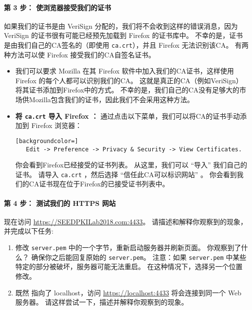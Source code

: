 \paragraph{第 3 步： 使浏览器接受我们的证书}
如果我们的证书是由 VeriSign 分配的，我们将不会收到这样的错误消息，因为 VeriSign 的证书很有可能已经预先加载到 Firefox 的证书库中。
不幸的是，\pkiserver 证书是由我们自己的CA签名的（即使用 {\tt ca.crt}），并且 Firefox 无法识别该CA。
有两种方法可以使 Firefox 接受我们的CA自签名证书。

\begin{itemize}

\item 我们可以要求 Mozilla 在其 Firefox 软件中加入我们的CA证书，这样使用 Firefox 的每个人都可以识别我们的CA。
这就是真正的CA（例如VeriSign）将其证书添加到Firefox中的方式。
不幸的是，我们自己的CA没有足够大的市场供Mozilla包含我们的证书，因此我们不会采用这种方法。

\item {\bf 将 {\tt ca.crt} 导入 Firefox ：}
通过点击以下菜单，我们可以将CA的证书手动添加到 Firefox 浏览器：

\begin{lstlisting}[backgroundcolor=]
   Edit -> Preference -> Privacy & Security -> View Certificates.
\end{lstlisting}

你会看到Firefox已经接受的证书列表。
从这里，我们可以 ``导入'' 我们自己的证书。
请导入 {\tt ca.crt} ，然后选择 ``信任此CA可以标识网站'' 。
你会看到我们的CA证书现在位于Firefox的已接受证书列表中。
\end{itemize}


\paragraph{第 4 步： 测试我们的 HTTPS 网站}
现在访问 \url{https://SEEDPKILab2018.com:4433}。
请描述和解释你观察到的现象，并完成以下任务:

\begin{enumerate}
\item 修改 {\tt server.pem} 中的一个字节，重新启动服务器并刷新页面。
      你观察到了什么？
      确保你之后能回复原始的 {\tt server.pem}。
      注意：如果 {\tt server.pem} 中某些特定的部分被破坏，服务器可能无法重启。
      在这种情况下，选择另一个位置修改。


\item 既然 \pkiserver 指向了 localhost，访问 \url{https://localhost:4433} 将会连接到同一个 Web 服务器。
      请这样尝试一下，描述并解释你观察到的现象。
\end{enumerate}



